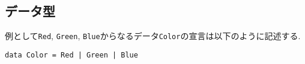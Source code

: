 \subsection{データ型}
例として\verb|Red|, \verb|Green|, \verb|Blue|からなるデータ\verb|Color|の宣言は以下のように記述する.
\begin{lstlisting}
data Color = Red | Green | Blue 
\end{lstlisting}
\begin{comment}
データを表示するためには, \verb|Color| を型クラス \verb|Show| のインスタンスにする必要があることに注意する.
\begin{lstlisting}
data Color = Red | Green | Blue deriving Show
\end{lstlisting}
\end{comment}
\begin{comment}
\subsection{型クラス}
\begin{lstlisting}
class Foo a where
    foo :: a -> String
instance Foo Bool where
    foo True = "Bool: True"
    foo False = "Bool: False"
instance Foo Int where
    foo x = "Int: " ++ show x
instance Foo Char where
    foo x = "Char: " ++ [x]

main = do
    putStrLn $ foo True		-- Bool: True
    putStrLn $ foo (123::Int)	-- Int: 123
    putStrLn $ foo 'A'		-- Char: A
\end{lstlisting}
Foo 型クラスは任意の型(a)を受け取り、Stringを返却するメソッド foo を持っている. instance を用いてそれぞれの型が引数に指定された場合の処理を実装している.
\subsection{型構築子}
また, 一つ以上の具体的な型に対して, 型構築子を適用すると新しい型を構築できる.
Maybe の定義は,
\begin{lstlisting}
data Maybe a = Nothing | Just a
data Maybe a = Nothing | Just a         
instance Eq a => Eq (Maybe a) 
instance Monad Maybe 
instance Functor Maybe 
instance Ord a => Ord (Maybe a) 
instance Read a => Read (Maybe a) 
instance Show a => Show (Maybe a) 
instance Applicative Maybe 
instance Foldable Maybe 
instance Traversable Maybe 
instance Monoid a => Monoid (Maybe a) 
\end{lstlisting}
Maybe は型構築子で Nothing および Just はデータ構築子です。
\end{comment}
